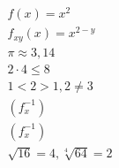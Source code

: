 \begin{align}
  f(x)=x^2\\
  f_{xy}(x)=x^{2-y}\\
  \pi \approx 3,14\\
  2 \cdot{} 4 \leq 8\\
  1 < 2 > 1, 2 \neq 3\\
  (f^{-1}_{x})\\
  \left(f^{-1}_{x}\right)\\
  \sqrt{16}=4, \sqrt[4]{64}=2
\end{align}
